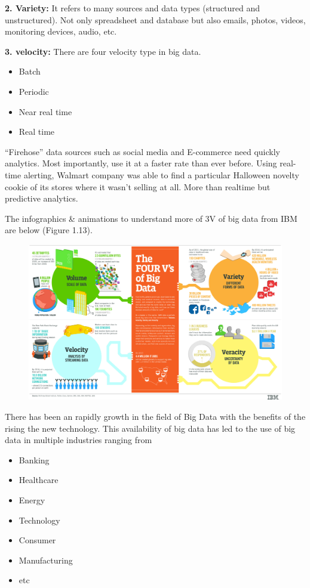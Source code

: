 \documentclass[]{book}
\providecommand{\tightlist}{%
  \setlength{\itemsep}{0pt}\setlength{\parskip}{0pt}}
\begin{document}
\textbf{2. Variety:} It refers to many sources and data types
(structured and unstructured). Not only spreadsheet and database but
also emails, photos, videos, monitoring devices, audio, etc.

\textbf{3. velocity:} There are four velocity type in big data.

\begin{itemize}
\tightlist
\item
  Batch
\item
  Periodic
\item
  Near real time
\item
  Real time
\end{itemize}

``Firehose'' data sources such as social media and E-commerce need
quickly analytics. Most importantly, use it at a faster rate than ever
before. Using real-time alerting, Walmart company was able to find a
particular Halloween novelty cookie of its stores where it wasn't
selling at all. More than realtime but predictive analytics.

The infographics \& animations to understand more of 3V of big data from
IBM are below (Figure 1.13).

\begin{figure}
\centering
\includegraphics{13.jpg}
\caption{}
\end{figure}

There has been an rapidly growth in the field of Big Data with the
benefits of the rising the new technology. This availability of big data
has led to the use of big data in multiple industries ranging from

\begin{itemize}
\tightlist
\item
  Banking
\item
  Healthcare
\item
  Energy
\item
  Technology
\item
  Consumer
\item
  Manufacturing
\item
  etc
\end{itemize}
\end{document}

